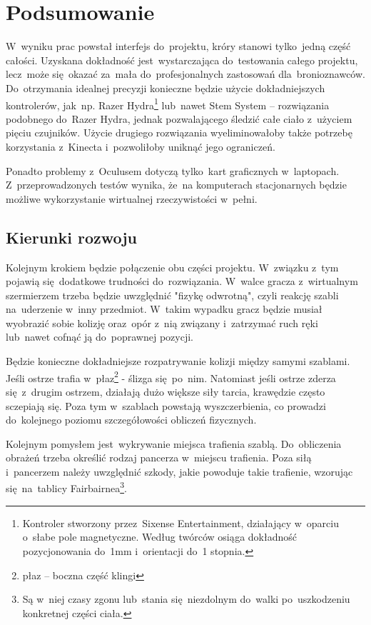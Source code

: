 \chapter{Podsumowanie} \label{cha:podsumowanie}

W~wyniku prac powstał interfejs do~projektu, króry stanowi tylko~jedną część całości.
Uzyskana dokładność jest~wystarczająca do~testowania całego projektu,
lecz~może się~okazać za~mała do~profesjonalnych zastosowań dla~bronioznawców.
Do~otrzymania idealnej precyzji konieczne będzie użycie dokładniejszych kontrolerów, jak~np. Razer Hydra\footnote{
	Kontroler stworzony przez~Sixense Entertainment, działający w~oparciu o~słabe pole magnetyczne. Według twórców osiąga dokładność pozycjonowania do~1mm i~orientacji do~1 stopnia.
}
lub~nawet Stem System -- rozwiązania podobnego do~Razer Hydra, 
jednak pozwalającego śledzić całe ciało z~użyciem pięciu czujników.
Użycie drugiego rozwiązania wyeliminowałoby także potrzebę korzystania z~Kinecta i~pozwoliłoby uniknąć jego ograniczeń.

Ponadto problemy z~Oculusem dotyczą tylko~kart graficznych w~laptopach.
Z~przeprowadzonych testów wynika, 
że~na komputerach stacjonarnych będzie możliwe wykorzystanie wirtualnej rzeczywistości w~pełni.

\section{Kierunki rozwoju} \label{sec:rozwoj}
Kolejnym krokiem będzie połączenie obu części projektu. 
W~związku z~tym pojawią się~dodatkowe trudności do~rozwiązania.
W~walce gracza z~wirtualnym szermierzem trzeba będzie uwzględnić "fizykę odwrotną", 
czyli reakcję szabli na~uderzenie w~inny przedmiot. 
W~takim wypadku gracz będzie musiał wyobrazić sobie kolizję oraz~opór z~nią związany i~zatrzymać ruch ręki 
lub~nawet cofnąć ją do~poprawnej pozycji.

Będzie konieczne dokładniejsze rozpatrywanie kolizji między samymi szablami.
Jeśli ostrze trafia w~płaz\footnote{ płaz -- boczna część klingi} - ślizga się~po~nim. 
Natomiast jeśli ostrze zderza się~z~drugim ostrzem, 
działają dużo większe siły tarcia, 
krawędzie często sczepiają się. 
Poza tym w~szablach powstają wyszczerbienia, 
co prowadzi do~kolejnego poziomu szczegółowości obliczeń fizycznych.

Kolejnym pomysłem jest~wykrywanie miejsca trafienia szablą. 
Do~obliczenia obrażeń trzeba określić rodzaj pancerza w~miejscu trafienia. 
Poza siłą i~pancerzem należy uwzględnić szkody, jakie powoduje takie trafienie, 
wzorując się~na~tablicy Fairbairn\textquotesingle ea\footnote{
	Są w~niej czasy zgonu lub~stania się~niezdolnym do~walki po~uszkodzeniu konkretnej części ciała.
}.

